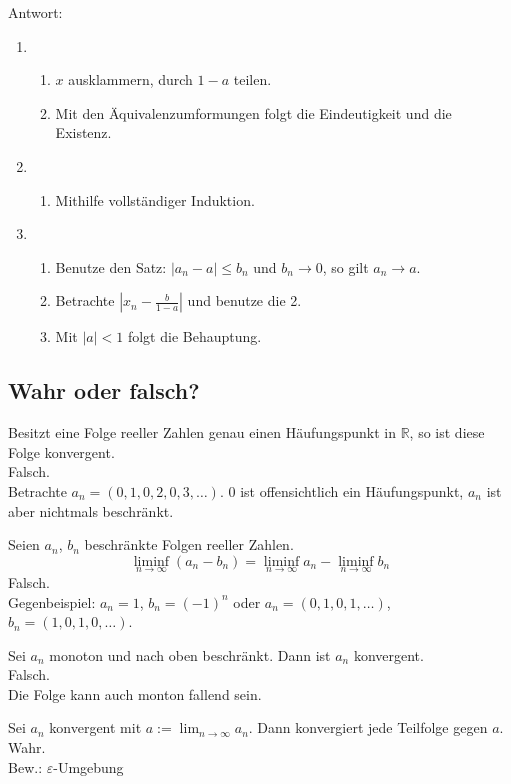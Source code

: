 \documentclass[parskip=full]{scrartcl}
\begin{document}
Antwort:
\begin{enumerate}
    \item
    \begin{enumerate}
        \item $x$ ausklammern, durch $1-a$ teilen.
        \item Mit den Äquivalenzumformungen folgt die Eindeutigkeit und die Existenz.
    \end{enumerate}
    \item
    \begin{enumerate}
        \item Mithilfe vollständiger Induktion.
    \end{enumerate}
    \item
    \begin{enumerate}
        \item Benutze den Satz: $|a_n - a| \leq b_n$ und $b_n \to 0$, so gilt $a_n \to a$.
        \item Betrachte $|x_n - \frac{b}{1-a}|$ und benutze die 2.
        \item Mit $|a| < 1$ folgt die Behauptung.
    \end{enumerate}
\end{enumerate}

\subsection{Wahr oder falsch?}
Besitzt eine Folge reeller Zahlen genau einen Häufungspunkt in $\mathbb{R}$, so ist diese Folge konvergent.\\
Falsch.\\
Betrachte $a_n = (0,1,0,2,0,3,\dots)$. $0$ ist offensichtlich ein Häufungspunkt, $a_n$ ist aber nichtmals beschränkt.

Seien $a_n$, $b_n$ beschränkte Folgen reeller Zahlen.
\begin{displaymath}
  \liminf_{n \to \infty} (a_n - b_n) = \liminf_{n \to \infty} a_n - \liminf_{n \to \infty} b_n
\end{displaymath}
Falsch.\\
Gegenbeispiel: $a_n = 1$, $b_n = (-1)^n$ oder $a_n = (0,1,0,1,\dots)$, $b_n = (1,0,1,0,\dots)$.

Sei $a_n$ monoton und nach oben beschränkt.
Dann ist $a_n$ konvergent.\\
Falsch.\\
Die Folge kann auch monton fallend sein.

Sei $a_n$ konvergent mit $a := \lim_{n \to \infty} a_n$.
Dann konvergiert jede Teilfolge gegen $a$.\\
Wahr.\\
Bew.: $\varepsilon$-Umgebung
\end{document}
